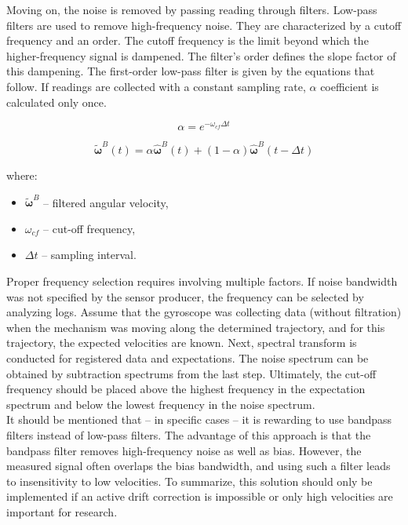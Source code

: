 Moving on, the noise is removed by passing reading through filters. Low-pass filters are used to remove high-frequency noise. They are characterized by a cutoff frequency and an order. The cutoff frequency is the limit beyond which the higher-frequency signal is dampened. The filter’s order defines the slope factor of this dampening. The first-order low-pass filter is given by the equations that follow. If readings are collected with a constant sampling rate, $\alpha$ coefficient is calculated only once.

\begin{equation}
	 \alpha = e^{ - \omega_{cf} \varDelta t}
	\label{lpf_alpha}
\end{equation}

\begin{equation}
	\bm{\tilde{\omega}}^B(t) = \alpha  \bm{\hat{\omega}}^B(t) + \left( 1 - \alpha \right) \bm{\hat{\omega}}^B(t - \varDelta t)
	\label{lpf}
\end{equation}

where:
\begin{itemize}
	\item $\bm{\tilde{\omega}}^B$ -- filtered angular velocity,
	\item $\omega_{cf}$ -- cut-off frequency,
	\item $\varDelta t$ -- sampling interval.
\end{itemize}

Proper frequency selection requires involving multiple factors. If noise bandwidth was not specified by the sensor producer, the frequency can be selected by analyzing logs. Assume that the gyroscope was collecting data (without filtration) when the mechanism was moving along the determined trajectory, and for this trajectory, the expected velocities are known. Next, spectral transform is conducted for registered data and expectations. The noise spectrum can be obtained by subtraction spectrums from the last step. Ultimately, the cut-off frequency should be placed above the highest frequency in the expectation spectrum and below the lowest frequency in the noise spectrum.\\

It should be mentioned that -- in specific cases -- it is rewarding to use bandpass filters instead of low-pass filters. The advantage of this approach is that the bandpass filter removes high-frequency noise as well as bias. However, the measured signal often overlaps the bias bandwidth, and using such a filter leads to insensitivity to low velocities. To summarize, this solution should only be implemented if an active drift correction is impossible or only high velocities are important for research.


